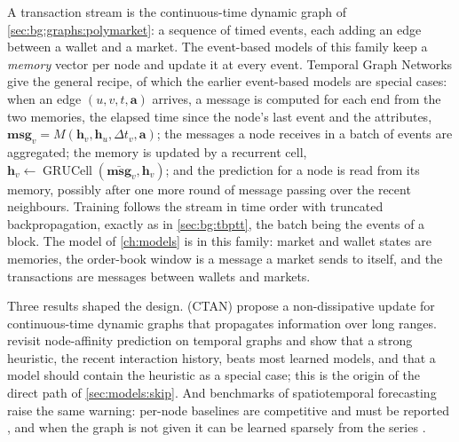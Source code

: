 A transaction stream is the continuous-time dynamic graph of
\cref{sec:bg:graphs:polymarket}: a sequence of timed events, each adding an edge between a
wallet and a market.  The event-based models of this family
keep a \emph{memory} vector per node and update it at every event.  Temporal Graph
Networks \cite{rossi2020tgn} give the general recipe, of which the earlier event-based
models \cite{kumar2019jodie,trivedi2019dyrep,xu2020tgat} are special cases: when an edge
$(u, v, t, \mathbf{a})$ arrives, a message is computed for each end from the two memories,
the elapsed time since the node's last event and the attributes, $\mathbf{msg}_v =
M(\mathbf{h}_v, \mathbf{h}_u, \Delta t_v, \mathbf{a})$; the messages a node receives in
a batch of events are aggregated; the memory is updated by a recurrent cell, $\mathbf{h}_v
\leftarrow \operatorname{GRUCell}(\bar{\mathbf{msg}}_v, \mathbf{h}_v)$; and the prediction
for a node is read from its memory, possibly after one more round of message passing over
the recent neighbours.  Training follows the stream in time order with truncated
backpropagation, exactly as in \cref{sec:bg:tbptt}, the batch being the events of a block.
The model of \cref{ch:models} is in this family: market and wallet states are memories,
the order-book window is a message a market sends to itself, and the transactions are
messages between wallets and markets.

Three results shaped the design.  \textcite{gravina2024ctan} (CTAN) propose a
non-dissipative update for continuous-time dynamic graphs that propagates information over
long ranges.  \textcite{feldman2026navis} revisit node-affinity prediction on temporal
graphs and show that a strong heuristic, the recent interaction history, beats most
learned models, and that a model should contain the heuristic as a special case; this is
the origin of the direct path of \cref{sec:models:skip}.  And benchmarks of spatiotemporal
forecasting raise the same warning: per-node baselines are competitive and must be reported
\cite{martin2026audit}, and when the graph is not given it can be learned sparsely from the
series \cite{cini2023sparse}.
